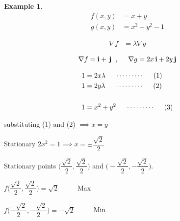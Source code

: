 \documentclass[11pt,a4paper]{article}
\theoremstyle{definition}
\newtheorem{exa}[thm]{Example}
\begin{document}
\begin{exa}
\begin{align*}
f(x,y) & = x + y \\
g(x,y) & =x^2 + y^2 - 1
\end{align*}

\begin{align*}
\nabla f & = \lambda \nabla g
\end{align*}

$$\nabla f = \textbf{i} + \,\textbf{j}\hspace{0.2cm},\hspace{0.5cm} \nabla g = 2x\, \textbf{i} + 2y\, \textbf{j}$$

\begin{align*}
1 & = 2x\lambda \hspace{0.5cm}\cdots\cdots\cdots\hspace{0.5cm}  (1)\\
1 & = 2y\lambda \hspace{0.5cm} \cdots\cdots\cdots\hspace{0.5cm} (2)\\\\
1 & = x^2 + y^2\hspace{0.5cm}\cdots\cdots\cdots \hspace{0.5cm}  (3)
\end{align*}

substituting (1) and (2) $\implies x = y$


Stationary $2x^2 = 1 \implies x = \pm \dfrac{\sqrt{2}}{2}$


Stationary points $\bigg(\dfrac{\sqrt{2}}{2}, \dfrac{\sqrt{2}}{2}\bigg)$ and $\bigg(-\dfrac{\sqrt{2}}{2}, -\dfrac{\sqrt{2}}{2}\bigg)$.


$f\bigg(\dfrac{\sqrt{2}}{2}, \dfrac{\sqrt{2}}{2}\bigg)=\sqrt{2}\hspace{1cm}$ Max


$f\bigg(\dfrac{-\sqrt{2}}{2}, \dfrac{-\sqrt{2}}{2}\bigg)=-\sqrt{2}\hspace{1cm}$ Min



\end{exa}
\end{document}
